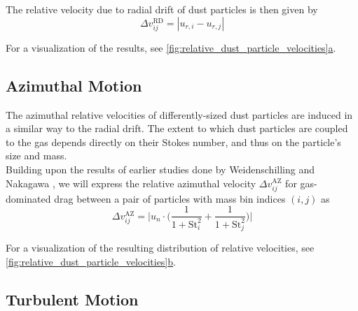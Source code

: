         The relative velocity due to radial drift of dust particles is then given by
        \begin{equation}
            \Delta v_{ij}^\text{RD}
            =|u_{r,i}-u_{r,j}|
        \end{equation}
    
        For a visualization of the results, see 
        \hyperref[fig:relative_dust_particle_velocities]
        {\cref*{fig:relative_dust_particle_velocities}a}.

    \subsection{Azimuthal Motion}

        The azimuthal relative velocities of differently-sized dust particles are induced in a 
        similar way to the radial drift. The extent to which dust particles are coupled to the gas 
        depends directly on their Stokes number, and thus on the particle's size and mass. \\

        Building upon the results of earlier studies done by 
        Weidenschilling \cite{weidenschilling_1977} and Nakagawa \cite{nakagawa_1986}, 
        we will express the relative azimuthal velocity $\Delta v^\text{AZ}_{ij}$ for 
        gas-dominated drag between a pair of particles with mass bin indices $(i, j)$ as
        \begin{equation}
            \Delta v^\text{AZ}_{ij}=\bigg|
                u_n\cdot\bigg(
                    \frac{1}{1+\text{St}_i^2}+
                    \frac{1}{1+\text{St}_j^2}
                \bigg)
            \bigg|
        \end{equation}

        For a visualization of the resulting distribution of relative velocities, see 
        \hyperref[fig:relative_dust_particle_velocities]
        {\cref*{fig:relative_dust_particle_velocities}b}.

    \subsection{Turbulent Motion}

